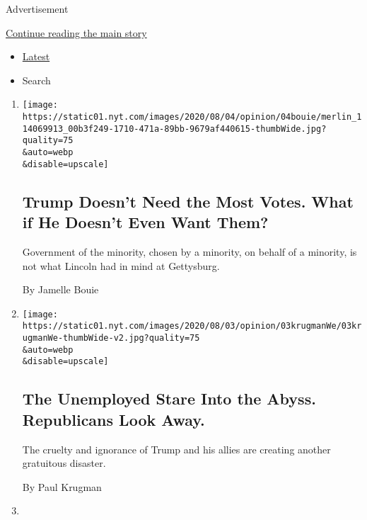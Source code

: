 Advertisement

\protect\hyperlink{after-mid1}{Continue reading the main story}

\begin{itemize}
\tightlist
\item
  \protect\hyperlink{stream-panel}{Latest}
\item
  Search
\end{itemize}

\begin{enumerate}
\def\labelenumi{\arabic{enumi}.}
\item
  \href{/2020/08/04/opinion/trump-2020-electoral-college.html}{}

  \texttt{[image: https://static01.nyt.com/images/2020/08/04/opinion/04bouie/merlin\_114069913\_00b3f249-1710-471a-89bb-9679af440615-thumbWide.jpg?quality=75\\\&auto=webp\\\&disable=upscale]}

  \hypertarget{trump-doesnt-need-the-most-votes-what-if-he-doesnt-even-want-them}{%
  \subsection{Trump Doesn't Need the Most Votes. What if He Doesn't Even
  Want
  Them?}\label{trump-doesnt-need-the-most-votes-what-if-he-doesnt-even-want-them}}

  Government of the minority, chosen by a minority, on behalf of a
  minority, is not what Lincoln had in mind at Gettysburg.

  By Jamelle Bouie
\item
  \href{/2020/08/03/opinion/republicans-unemployed-coronavirus.html}{}

  \texttt{[image: https://static01.nyt.com/images/2020/08/03/opinion/03krugmanWe/03krugmanWe-thumbWide-v2.jpg?quality=75\\\&auto=webp\\\&disable=upscale]}

  \hypertarget{the-unemployed-stare-into-the-abyss-republicans-look-away}{%
  \subsection{The Unemployed Stare Into the Abyss. Republicans Look
  Away.}\label{the-unemployed-stare-into-the-abyss-republicans-look-away}}

  The cruelty and ignorance of Trump and his allies are creating another
  gratuitous disaster.

  By Paul Krugman
\item
  \href{/2020/08/03/opinion/trump-biden-2020.html}{}


\end{enumerate}
